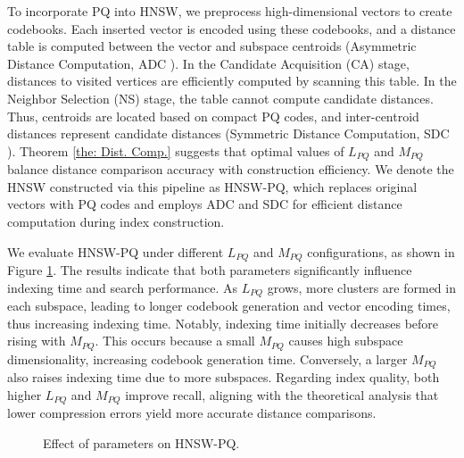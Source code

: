 To incorporate PQ into HNSW, we preprocess high-dimensional vectors to create codebooks. Each inserted vector is encoded using these codebooks, and a distance table is computed between the vector and subspace centroids (Asymmetric Distance Computation, ADC \cite{PQ}). In the Candidate Acquisition (CA) stage, distances to visited vertices are efficiently computed by scanning this table. In the Neighbor Selection (NS) stage, the table cannot compute candidate distances. Thus, centroids are located based on compact PQ codes, and inter-centroid distances represent candidate distances (Symmetric Distance Computation, SDC \cite{PQ}). Theorem \ref{the: Dist. Comp.} suggests that optimal values of $L_{PQ}$ and $M_{PQ}$ balance distance comparison accuracy with construction efficiency. We denote the HNSW constructed via this pipeline as HNSW-PQ, which replaces original vectors with PQ codes and employs ADC and SDC for efficient distance computation during index construction.

We evaluate HNSW-PQ under different $L_{PQ}$ and $M_{PQ}$ configurations, as 
shown in Figure \ref{fig: HNSW-PQ laion1m}. The results indicate that both parameters significantly influence indexing time and search performance. As $L_{PQ}$ grows, more clusters are formed in each subspace, leading to longer codebook generation and vector encoding times, thus increasing indexing time. Notably, indexing time initially decreases before rising with $M_{PQ}$. This occurs because a small $M_{PQ}$ causes high subspace dimensionality, increasing codebook generation time. Conversely, a larger $M_{PQ}$ also raises indexing time due to more subspaces. Regarding index quality, both higher $L_{PQ}$ and $M_{PQ}$ improve recall, aligning with the theoretical analysis that lower compression errors yield more accurate distance comparisons.

\begin{figure}
\setlength{\abovecaptionskip}{0cm}
  \setlength{\belowcaptionskip}{0cm}
  \centering
  \footnotesize
  \hspace{0.15cm}
  \newline
  \caption{Effect of parameters on HNSW-PQ.}
  \label{fig: HNSW-PQ laion1m}
\end{figure}


